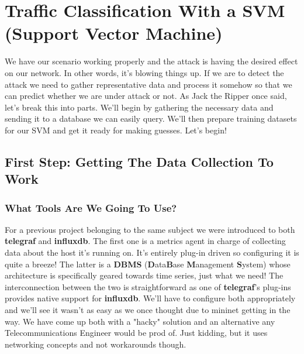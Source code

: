 \documentclass[12pt]{report}
\begin{document}
	\section{Traffic Classification With a SVM (\textbf{S}upport \textbf{V}ector \textbf{M}achine)}
		We have our scenario working properly and the attack is having the desired effect on our network. In other words, it's blowing things up. If we are to detect the attack we need to gather representative data and process it somehow so that we can predict whether we are under attack or not. As Jack the Ripper once said, let's break this into parts. We'll begin by gathering the necessary data and sending it to a database we can easily query. We'll then prepare training datasets for our SVM and get it ready for making guesses. Let's begin!

		\subsection{First Step: Getting The Data Collection To Work}
			\subsubsection{What Tools Are We Going To Use?}
				For a previous project belonging to the same subject we were introduced to both \textbf{telegraf} and \textbf{influxdb}. The first one is a metrics agent in charge of collecting data about the host it's running on. It's entirely plug-in driven so configuring it is quite a breeze! The latter is a \textbf{DBMS} (\textbf{D}ata\textbf{B}ase \textbf{M}anagement \textbf{S}ystem) whose architecture is specifically geared towards time series, just what we need! The interconnection between the two is straightforward as one of \textbf{telegraf}'s plug-ins provides native support for \textbf{influxdb}. We'll have to configure both appropriately and we'll see it wasn't as easy as we once thought due to mininet getting in the way. We have come up both with a "hacky" solution and an alternative any Telecommunications Engineer would be prod of. Just kidding, but it uses networking concepts and not workarounds though.
\end{document}
